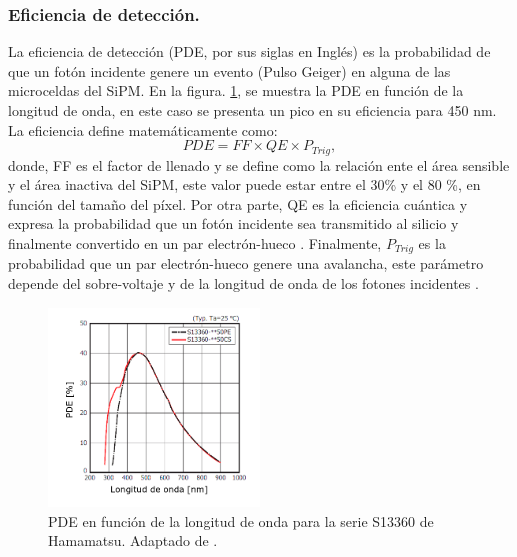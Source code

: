 \subsubsection{Eficiencia de detección.}
La eficiencia de detección (PDE, por sus siglas en Inglés) es la probabilidad de que un fotón incidente genere un evento (Pulso Geiger) en alguna de las microceldas del SiPM. En la figura. \ref{fig:PDE}, se muestra la PDE en función de la longitud de onda, en este caso se presenta un pico en su eficiencia para 450 nm. La eficiencia define matemáticamente como:
\begin{equation}
    PDE= FF\times QE \times P_{Trig},
\end{equation}
donde, FF es el factor de llenado y  se define como la relación ente el área sensible y el área inactiva del SiPM, este valor puede  estar entre el 30\% y el 80 \%, en función del tamaño del píxel. Por otra parte, QE es la eficiencia cuántica y expresa la probabilidad que un fotón incidente sea transmitido al silicio y finalmente convertido en un par electrón-hueco \citep{Study_SiPM}. Finalmente, $P_{Trig}$ es la probabilidad que un par electrón-hueco genere una avalancha, este parámetro depende del sobre-voltaje y de la longitud de onda de los fotones incidentes \citep{Study_SiPM_FBK}.\\

\begin{figure}[h!]
\begin{centering}
  \includegraphics[width=0.5\textwidth]{Images/PDE.PNG}
    \caption{PDE en función de la longitud de onda para la serie S13360 de Hamamatsu. Adaptado de \citep{Sipm_S13360_1350CS_datasheet}.}
    \label{fig:PDE}  
  \par\end{centering}
\end{figure}

